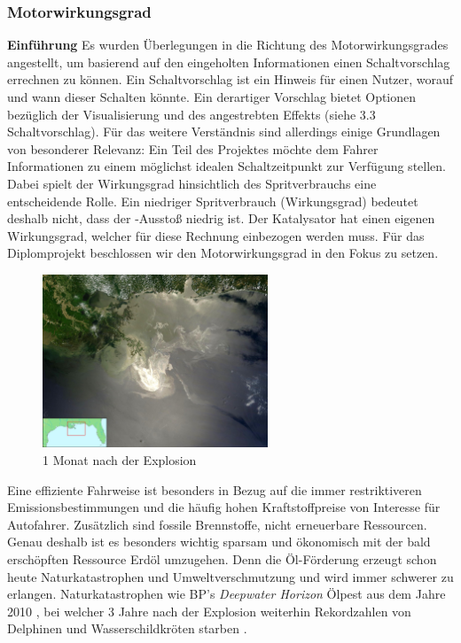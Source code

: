 \subsubsection{Motorwirkungsgrad}
\label{subsec:motorwirkungsgrad}

\textbf{Einführung\newline}
Es wurden Überlegungen in die Richtung des Motorwirkungsgrades angestellt, um basierend auf den eingeholten Informationen einen Schaltvorschlag errechnen zu können. Ein Schaltvorschlag ist ein Hinweis für einen Nutzer, worauf und wann dieser Schalten könnte. Ein derartiger Vorschlag bietet Optionen bezüglich der Visualisierung und des angestrebten Effekts (siehe 3.3 Schaltvorschlag). Für das weitere Verständnis sind allerdings einige Grundlagen von besonderer Relevanz:
Ein Teil des Projektes möchte dem Fahrer Informationen zu einem möglichst idealen Schaltzeitpunkt zur Verfügung stellen. Dabei spielt der Wirkungsgrad hinsichtlich des Spritverbrauchs eine entscheidende Rolle. Ein niedriger Spritverbrauch (Wirkungsgrad) bedeutet deshalb nicht, dass der -Ausstoß niedrig ist. Der Katalysator hat einen eigenen Wirkungsgrad, welcher für diese Rechnung einbezogen werden muss. Für das Diplomprojekt beschlossen wir den Motorwirkungsgrad in den Fokus zu setzen.

\begin{figure}\centering
    \includegraphics[width=0.6\textwidth]{images/bpOilSpillSatelite}
    \caption{1 Monat nach der Explosion \cite{SIMR.CH2-motorwirkungsgrad.bpOilSpillSatelite}} \label{Fig:imgBPOilSpill}
\end{figure}
Eine effiziente Fahrweise ist besonders in Bezug auf die immer restriktiveren Emissionsbestimmungen und die häufig hohen Kraftstoffpreise von Interesse für Autofahrer. Zusätzlich sind fossile Brennstoffe, nicht erneuerbare Ressourcen. Genau deshalb ist es besonders wichtig sparsam und ökonomisch mit der bald erschöpften Ressource Erdöl umzugehen. 
Denn die Öl-Förderung erzeugt schon heute Naturkatastrophen und Umweltverschmutzung und wird immer schwerer zu erlangen.
Naturkatastrophen wie BP's \textit{Deepwater Horizon} Ölpest aus dem Jahre 2010 \cite{SIMR.CH2-motorwirkungsgrad.BPSpillGeneral}, bei welcher 3 Jahre nach der Explosion weiterhin Rekordzahlen von Delphinen und Wasserschildkröten starben \cite{SIMR.CH2-motorwirkungsgrad.BPSpillDeaths}. 

